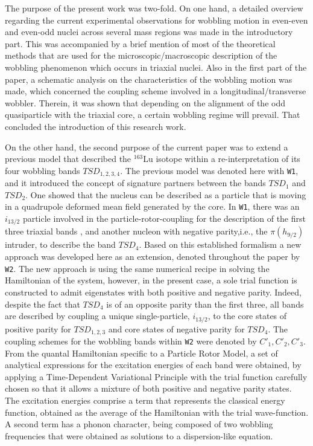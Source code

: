 \documentclass[11pt]{article}
\begin{document}
The purpose of the present work was two-fold. On one hand, a detailed overview regarding the current experimental observations for wobbling motion in even-even and even-odd nuclei across several mass regions was made in the introductory part. This was accompanied by a brief mention of most of the theoretical methods that are used for the microscopic/macroscopic description of the wobbling phenomenon which occurs in triaxial nuclei. Also in the first part of the paper, a schematic analysis on the characteristics of the wobbling motion was made, which concerned the coupling scheme involved in a longitudinal/transverse wobbler. Therein, it was shown that depending on the alignment of the odd quasiparticle with the triaxial core, a certain wobbling regime will prevail. That concluded the introduction of this research work.

On the other hand, the second purpose of the current paper was to extend a previous model that described the $^{163}$Lu isotope within a re-interpretation of its four wobbling bands $TSD_{1,2,3,4}$. The previous model was denoted here with \texttt{W1}, and it introduced the concept of signature partners between the bands $TSD_1$ and $TSD_2$. One showed that the nucleus can be described as a particle that is moving in a quadrupole deformed mean field generated by the core. In \texttt{W1}, there was an $i_{13/2}$ particle involved in the particle-rotor-coupling for the description of the first three triaxial bands , and another nucleon with negative parity,i.e., the $\pi(h_{9/2})$ intruder, to describe the band $TSD_4$. Based on this established formalism a new approach was developed here as an extension, denoted throughout the paper by \texttt{W2}. The new approach is using the same numerical recipe in solving the Hamiltonian of the system, however, in the present case, a sole trial function is constructed to admit eigenstates with both positive and negative parity. Indeed, despite the fact that $TSD_4$ is of an opposite parity than the first three, all bands are described by coupling a unique single-particle, $i_{13/2}$, to the core states of positive parity for $TSD_{1,2,3}$ and core states of negative parity for $TSD_4$. The coupling schemes for the wobbling bands within \texttt{W2} were denoted by $C'_1, C'_2, C'_3$. From the quantal Hamiltonian specific to a Particle Rotor Model, a set of analytical expressions for the excitation energies of each band were obtained, by applying a Time-Dependent Variational Principle with the trial function carefully chosen so that it allows a mixture of both positive and negative parity states. The excitation energies comprise a term that represents the classical energy function, obtained as the average of the Hamiltonian with the trial wave-function. A second term has a phonon character, being composed of two wobbling frequencies that were obtained as solutions to a dispersion-like equation. 
\end{document}
